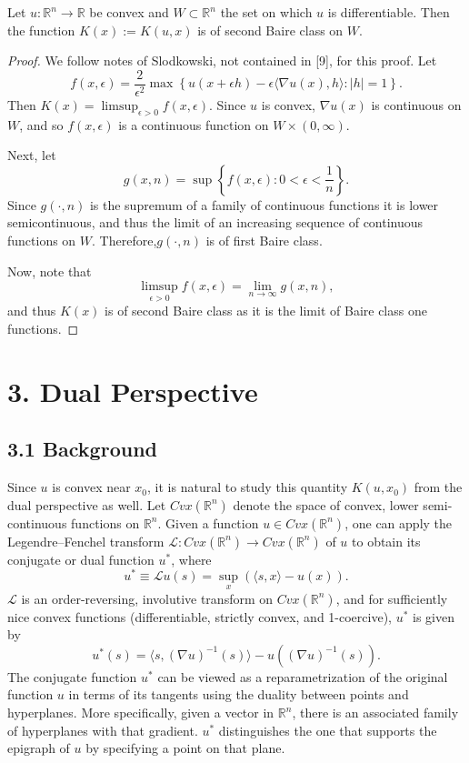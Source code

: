 \documentclass[10pt]{article}
\newenvironment{lemma}[2][Lemma]{\begin{trivlist}
\item[\hskip \labelsep {\bfseries #1}\hskip \labelsep {\bfseries #2.}]}{\end{trivlist}}
\begin{document}
\begin{lemma}{2.3}
Let $u:\mathbb{R}^n\rightarrow \mathbb{R}$ be convex and $W \subset \mathbb{R}^n$ the set on which $u$ is differentiable. Then the function $K(x):=K(u,x)$ is of second Baire class on $W$.
\end{lemma}
\begin{proof}
We follow notes of Slodkowski, not contained in [9], for this proof. Let
$$f(x,\epsilon)= \frac{2}{\epsilon^2} \max \left\{ u(x+\epsilon h) - \epsilon \langle \nabla u(x), h \rangle : |h|=1    \right\}.$$
Then $K(x)= \limsup_{\epsilon >0} f(x, \epsilon).$ Since $u$ is convex, $\nabla u(x)$ is continuous on $W$, and so $f(x, \epsilon)$ is a continuous function on $W \times (0, \infty)$.

Next, let $$g(x,n)= \sup \left\{ f(x, \epsilon): 0< \epsilon< \frac{1}{n}  \right\}.$$
Since $g(\cdotp,n)$ is the supremum of a family of continuous functions it is lower semicontinuous, and thus the limit of an increasing sequence of continuous functions on $W$. Therefore,$g(\cdotp,n)$ is of first Baire class.

Now, note that $$\limsup_{\epsilon>0} f(x, \epsilon)= \lim_{n\rightarrow \infty}g(x,n),$$
and thus $K(x)$ is of second Baire class as it is the limit of Baire class one functions.
\end{proof}

\section{3. Dual Perspective}
\subsection{3.1 Background} 
Since $u$ is convex near $x_0$, it is natural to study this quantity $K(u,x_0)$ from the dual perspective as well. Let $Cvx(\mathbb{R}^n)$ denote the space of convex, lower semi-continuous functions on $\mathbb{R}^n$. Given a function $u\in Cvx(\mathbb{R}^n)$, one can apply  the Legendre--Fenchel transform $\mathscr{L}:Cvx(\mathbb{R}^n)\rightarrow Cvx(\mathbb{R}^n)$ of $u$ to obtain its conjugate or dual function $u^*$, where 
$$ u^*\equiv \mathscr{L}u(s)=\sup_{x} (\langle s,x\rangle-u(x)).$$
$\mathscr{L}$ is an order-reversing, involutive transform on $Cvx(\mathbb{R}^n)$, and for sufficiently nice convex functions (differentiable, strictly convex, and 1-coercive), $u^*$ is given by
$$u^*(s)=\langle s, (\nabla u)^{-1}(s) \rangle - u((\nabla u)^{-1}(s)).$$
The conjugate function $u^*$ can be viewed as a reparametrization of the original function $u$ in terms of its tangents using the duality between points and hyperplanes. More specifically, given a vector in $\mathbb{R}^n$, there is an associated family of hyperplanes with that gradient. $u^*$ distinguishes the one that supports the epigraph of $u$ by specifying a point on that plane.
\end{document}
